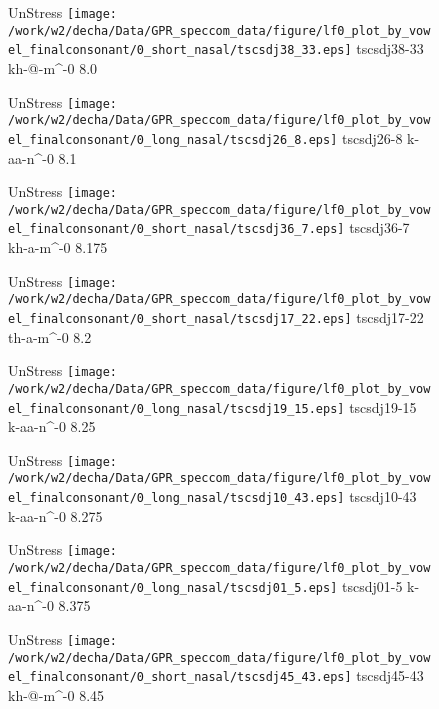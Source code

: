 \documentclass{article}
\begin{document}
\begin{figure}[t]
\begin{minipage}[b]{.24\textwidth}
UnStress
\centering
\texttt{[image: /work/w2/decha/Data/GPR\_speccom\_data/figure/lf0\_plot\_by\_vowel\_finalconsonant/0\_short\_nasal/tscsdj38\_33.eps]}
tscsdj38-33 kh-@-m\textasciicircum-0 8.0
\end{minipage}
\begin{minipage}[b]{.24\textwidth}
UnStress
\centering
\texttt{[image: /work/w2/decha/Data/GPR\_speccom\_data/figure/lf0\_plot\_by\_vowel\_finalconsonant/0\_long\_nasal/tscsdj26\_8.eps]}
tscsdj26-8 k-aa-n\textasciicircum-0 8.1
\end{minipage}
\begin{minipage}[b]{.24\textwidth}
UnStress
\centering
\texttt{[image: /work/w2/decha/Data/GPR\_speccom\_data/figure/lf0\_plot\_by\_vowel\_finalconsonant/0\_short\_nasal/tscsdj36\_7.eps]}
tscsdj36-7 kh-a-m\textasciicircum-0 8.175
\end{minipage}
\begin{minipage}[b]{.24\textwidth}
UnStress
\centering
\texttt{[image: /work/w2/decha/Data/GPR\_speccom\_data/figure/lf0\_plot\_by\_vowel\_finalconsonant/0\_short\_nasal/tscsdj17\_22.eps]}
tscsdj17-22 th-a-m\textasciicircum-0 8.2
\end{minipage}
\end{figure}

\begin{figure}[t]
\begin{minipage}[b]{.24\textwidth}
UnStress
\centering
\texttt{[image: /work/w2/decha/Data/GPR\_speccom\_data/figure/lf0\_plot\_by\_vowel\_finalconsonant/0\_long\_nasal/tscsdj19\_15.eps]}
tscsdj19-15 k-aa-n\textasciicircum-0 8.25
\end{minipage}
\begin{minipage}[b]{.24\textwidth}
UnStress
\centering
\texttt{[image: /work/w2/decha/Data/GPR\_speccom\_data/figure/lf0\_plot\_by\_vowel\_finalconsonant/0\_long\_nasal/tscsdj10\_43.eps]}
tscsdj10-43 k-aa-n\textasciicircum-0 8.275
\end{minipage}
\begin{minipage}[b]{.24\textwidth}
UnStress
\centering
\texttt{[image: /work/w2/decha/Data/GPR\_speccom\_data/figure/lf0\_plot\_by\_vowel\_finalconsonant/0\_long\_nasal/tscsdj01\_5.eps]}
tscsdj01-5 k-aa-n\textasciicircum-0 8.375
\end{minipage}
\begin{minipage}[b]{.24\textwidth}
UnStress
\centering
\texttt{[image: /work/w2/decha/Data/GPR\_speccom\_data/figure/lf0\_plot\_by\_vowel\_finalconsonant/0\_short\_nasal/tscsdj45\_43.eps]}
tscsdj45-43 kh-@-m\textasciicircum-0 8.45
\end{minipage}
\end{figure}
\end{document}
